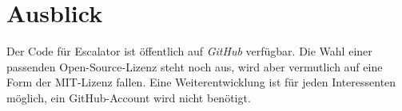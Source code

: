 \documentclass[11pt,utf8,notoc,bibnum,german,final]{zihpub}
\begin{document}

\section{Ausblick}


Der Code für Escalator ist öffentlich auf \emph{GitHub} \cite{escalator-github}
verfügbar. Die Wahl einer passenden Open-Source-Lizenz steht noch aus, wird
aber vermutlich auf eine Form der MIT-Lizenz fallen. Eine Weiterentwicklung ist
für jeden Interessenten möglich, ein GitHub-Account wird nicht benötigt.
\end{document}

